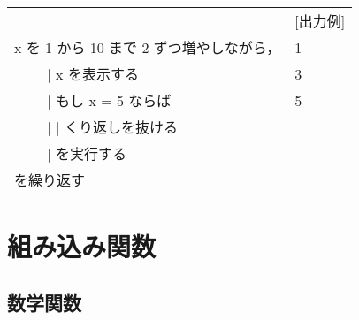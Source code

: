 \documentclass[11pt,a4j]{jarticle}
\begin{document}
\begin{table}[!h]
{\small 
\hspace{1cm}
\begin{tabular}{l l}
\noindent [使用例] & \hspace{1cm} [出力例] \\
\hspace{1cm} \noindent x を 1 から 10 まで 2 ずつ増やしながら，& 
\hspace{2cm} 1 \\
\hspace{1cm} \ \ \ \  \hspace{1zw} $|$ \hspace{1zw}  x を表示する & 
\hspace{2cm} 3 \\
\hspace{1cm} \ \ \ \  \hspace{1zw} $|$ \hspace{1zw}  もし x = 5 ならば & 
\hspace{2cm} 5 \\
\hspace{1cm} \ \ \ \  \hspace{1zw} $|$ \hspace{2zw} $|$ \hspace{1zw} くり返しを抜ける & 
\hspace{1cm}  \\
\hspace{1cm} \ \ \ \  \hspace{1zw} $|$ \hspace{1zw}  を実行する & 
\hspace{1cm}  \\
\hspace{1cm} を繰り返す &
\hspace{1cm}  \\
\end{tabular}
} %
\end{table}

\section{組み込み関数}

\vspace{-2mm}
\subsection{数学関数}
\end{document}
